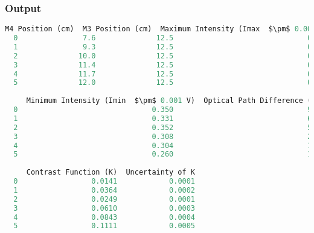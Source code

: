 \documentclass[a4paper,11pt]{article}
\begin{document}
\subsubsection*{Output}
\begin{lstlisting}[language=Python]
  M4 Position (cm)  M3 Position (cm)  Maximum Intensity (Imax  $\pm$ 0.001 V)  \
  0               7.6              12.5                               0.360   
  1               9.3              12.5                               0.356   
  2              10.0              12.5                               0.370   
  3              11.4              12.5                               0.348   
  4              11.7              12.5                               0.360   
  5              12.0              12.5                               0.325   
  
     Minimum Intensity (Imin  $\pm$ 0.001 V)  Optical Path Difference ($\Delta L$, cm)  \
  0                               0.350                               9.8   
  1                               0.331                               6.4   
  2                               0.352                               5.0   
  3                               0.308                               2.2   
  4                               0.304                               1.6   
  5                               0.260                               1.0   
  
     Contrast Function (K)  Uncertainty of K  
  0                 0.0141            0.0001  
  1                 0.0364            0.0002  
  2                 0.0249            0.0001  
  3                 0.0610            0.0003  
  4                 0.0843            0.0004  
  5                 0.1111            0.0005
\end{lstlisting}
\newpage
\end{document}
